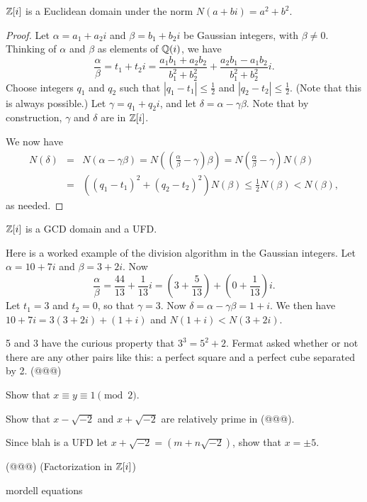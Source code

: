 \begin{prop}
\(\mathbb{Z}[i]\) is a Euclidean domain under the norm \(N(a+bi) = a^2 + b^2\).
\end{prop}

\begin{proof}
Let \(\alpha = a_1 + a_2 i\) and \(\beta = b_1 + b_2 i\) be Gaussian integers, with \(\beta \neq 0\).
Thinking of \(\alpha\) and \(\beta\) as elements of \(\mathbb{Q}(i)\), we have \[ \frac{\alpha}{\beta} = t_1 + t_2 i = \frac{a_1b_1 + a_2b_2}{b_1^2 + b_2^2} + \frac{a_2b_1 - a_1b_2}{b_1^2 + b_2^2} i. \] Choose integers \(q_1\) and \(q_2\) such that \(|q_1 - t_1| \leq \frac{1}{2}\) and \(|q_2 - t_2| \leq \frac{1}{2}\).
(Note that this is always possible.) Let \(\gamma = q_1 + q_2 i\), and let \(\delta = \alpha - \gamma\beta\).
Note that by construction, \(\gamma\) and \(\delta\) are in \(\mathbb{Z}[i]\).

We now have
\begin{eqnarray*}
N(\delta) & = & N(\alpha - \gamma\beta) = N\left((\frac{\alpha}{\beta} - \gamma)\beta\right) = N(\frac{\alpha}{\beta} - \gamma)N(\beta) \\
 & = & ((q_1-t_1)^2 + (q_2-t_2)^2)N(\beta) \leq \frac{1}{2}N(\beta) < N(\beta),
\end{eqnarray*}
as needed.
\end{proof}

\begin{cor}
\(\mathbb{Z}[i]\) is a GCD domain and a UFD.
\end{cor}

Here is a worked example of the division algorithm in the Gaussian integers.
Let \(\alpha = 10+7i\) and \(\beta = 3+2i\).
Now \[ \frac{\alpha}{\beta} = \frac{44}{13} + \frac{1}{13}i = (3 + \frac{5}{13}) + (0 + \frac{1}{13})i. \] Let \(t_1 = 3\) and \(t_2 = 0\), so that \(\gamma = 3\).
Now \(\delta = \alpha - \gamma\beta = 1+i\).
We then have \(10+7i = 3(3+2i) + (1+i)\) and \(N(1+i) < N(3+2i)\).


\Exercises%

\begin{exercise}
5 and 3 have the curious property that \(3^3 = 5^2 + 2\).
Fermat asked whether or not there are any other pairs like this: a perfect square and a perfect cube separated by 2.
(@@@)
\begin{proplist}
\item Show that \(x \equiv y \equiv 1 \pmod{2}\).
\item Show that \(x - \sqrt{-2}\) and \(x + \sqrt{-2}\) are relatively prime in (@@@).
\item Since blah is a UFD let \(x + \sqrt{-2} = (m+n\sqrt{-2})\), show that \(x = \pm 5\).
\end{proplist}
\end{exercise}

\begin{exercise}
(@@@) (Factorization in \(\mathbb{Z}[i]\))
\end{exercise}

mordell equations
